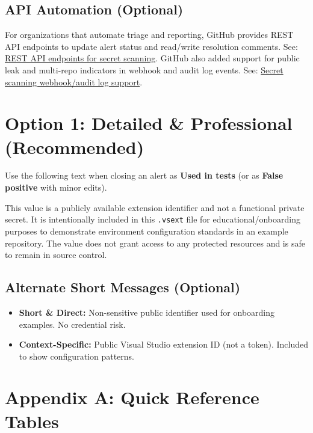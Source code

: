 \documentclass[11pt]{article}
\newcommand{\term}[1]{\textbf{#1}}
\newcommand{\code}[1]{\texttt{#1}}
\begin{document}
\subsection{API Automation (Optional)}
For organizations that automate triage and reporting, GitHub provides REST API endpoints to update alert status and read/write resolution comments. See: \href{https://docs.github.com/en/rest/secret-scanning/secret-scanning}{REST API endpoints for secret scanning}. GitHub also added support for public leak and multi-repo indicators in webhook and audit log events. See: \href{https://github.blog/changelog/2024-10-24-secret-scanning-support-for-public-leak-and-multi-repository-indicators-in-webhook-and-audit-log-events/}{Secret scanning webhook/audit log support}.

\section{Option 1: Detailed \& Professional (Recommended)}
Use the following text when closing an alert as \term{Used in tests} (or as \term{False positive} with minor edits).

\begin{tcolorbox}[colback=LightGray,colframe=Gray,title=Dismissal Message (Detailed \& Professional)]
This value is a publicly available extension identifier and not a functional private secret. It is intentionally included in this \code{.vsext} file for educational/onboarding purposes to demonstrate environment configuration standards in an example repository. The value does not grant access to any protected resources and is safe to remain in source control.
\end{tcolorbox}

\subsection{Alternate Short Messages (Optional)}
\begin{itemize}
  \item \textbf{Short \& Direct:} Non-sensitive public identifier used for onboarding examples. No credential risk.
  \item \textbf{Context-Specific:} Public Visual Studio extension ID (not a token). Included to show configuration patterns.
\end{itemize}

\section{Appendix A: Quick Reference Tables}
\end{document}
